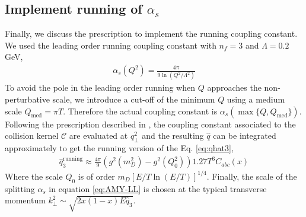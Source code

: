 \documentclass[aps, prc, reprint, amsmath, groupedaddress, nofootinbib]{revtex4-1}
\begin{document}
\subsection{Implement running of $\alpha_s$}\label{section:running}
Finally, we discuss the prescription to implement the running coupling constant.
We used the leading order running coupling constant with $n_f = 3$ and $\Lambda = 0.2$ GeV, 
\begin{eqnarray}
\alpha_s(Q^2) = \frac{4\pi}{9\ln\left(Q^2/\Lambda^2\right)}
\end{eqnarray}
To avoid the pole in the leading order running when $Q$ approaches the non-perturbative scale, we introduce a cut-off of the minimum $Q$ using a medium scale $Q_{\textrm{med}} = \pi T$. 
Therefore the actual coupling constant is $\alpha_s(\max\{Q, Q_{\textrm{med}}\})$.
Following the prescription described in \cite{Arnold:2008zu}, the coupling constant associated to the collision kernel $\mathcal{C}$ are evaluated at $q_\perp^2$ and the resulting $\hat{q}$ can be integrated approximately to get the running version of the Eq. \ref{eq:qhat3},
\begin{eqnarray}
\hat{q}_3^{\textrm{running}} \approx \frac{4\pi}{9}\left(g^2(m_D^2) - g^2(Q_0^2)\right) 1.27 T^3 C_{abc}(x)
\label{eq:q3running}
\end{eqnarray}
Where the scale $Q_0$ is of order $m_D [E/T \ln(E/T)]^{1/4}$.
Finally, the scale of the splitting $\alpha_s$ in equation \ref{eq:AMY-LL}
is chosen at the typical transverse momentum $k_\perp^2 \sim \sqrt{2x(1-x)E\hat{q}_3}$.
\end{document}
